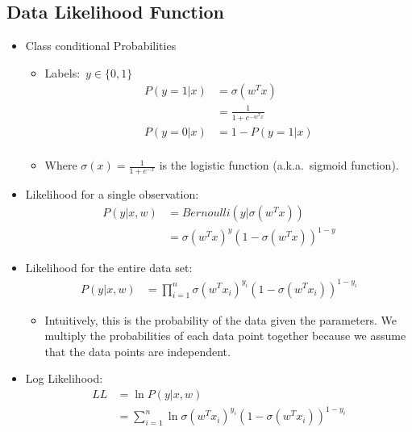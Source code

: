 \documentclass[12pt]{article}
\begin{document}
        \subsection{Data Likelihood Function}
            \begin{itemize}
                \item Class conditional Probabilities
                \begin{itemize}
                    \item Labels:\ $y \in \{0, 1\}$
                    \begin{align*}
                        P(y = 1 | x) &= \sigma({w^T}x) \\
                        &= \frac{1}{1 + e^{-{w^T}x}} \\
                        P(y = 0 | x) &= 1 - P(y = 1 | x) \\
                    \end{align*}
                    \item Where $\sigma(x) = \frac{1}{1 + e^{-x}}$ is the logistic function (a.k.a.\ sigmoid function).
                \end{itemize}
                \item Likelihood for a single observation:
                \begin{align*}
                    P(y | x, w) &= Bernoulli(y | \sigma({w^T}x)) \\
                    &= \sigma{({w^T}x)}^y{(1 - \sigma({w^T}x))}^{1 - y}
                \end{align*}
                \item Likelihood for the entire data set:
                \begin{align*}
                    P(y | x, w) &= \prod_{i = 1}^n \sigma{({w^T}x_i)}^{y_i}{(1 - \sigma({w^T}x_i))}^{1 - y_i}
                \end{align*}
                \begin{itemize}
                    \item Intuitively, this is the probability of the data given the parameters. We multiply the probabilities of each data point together because we assume that the data points are independent.
                \end{itemize}
                \item Log Likelihood:
                \begin{align*}
                    LL &= \ln P(y | x, w) \\
                    &= \sum_{i = 1}^n \ln \sigma{({w^T}x_i)}^{y_i}{(1 - \sigma({w^T}x_i))}^{1 - y_i} \\

\end{align*}
\end{itemize}
\end{document}
